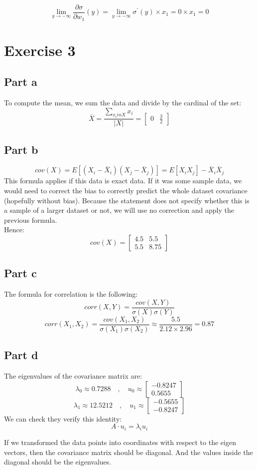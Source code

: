 \documentclass[a4paper, 10pt]{article}
\begin{document}
$$
\lim_{y\to -\infty}\frac{\partial\sigma}{\partial w_1}(y) = \lim_{y\to -\infty} \sigma^\prime(y) \times x_1 = 0 \times x_1 = 0
$$

\section{Exercise 3}
\subsection{Part a}
To compute the mean, we sum the data and divide by the cardinal of the set:
$$
\bar{X} = \frac{\sum_{x_i in X}x_i}{\left\vert X\right\vert} = 
\begin{bmatrix}
    0 & \frac{3}{2}
\end{bmatrix}
$$

\subsection{Part b}
$$
cov(X) = E\left[(X_i - \bar X_i)(X_j - \bar X_j)\right] = E\left[X_iX_j\right] - \bar X_i\bar X_j
$$
This formula applies if this data is exact data. If it was some sample data, we would need to correct the 
bias to correctly predict the whole dataset covariance (hopefully without bias).
Because the statement does not specify whether this is a sample of a larger dataset or not,
we will use no correction and apply the previous formula.
\\
Hence:
$$
cov(X) = \begin{bmatrix}
            4.5 & 5.5\\
            5.5 & 8.75
        \end{bmatrix}
$$

\subsection{Part c}
The formula for correlation is the following:
$$
corr(X, Y) = \frac{cov(X, Y)}{\sigma(X)\sigma(Y)}
$$
$$
corr(X_1, X_2) = \frac{cov(X_1, X_2)}{\sigma(X_1)\sigma(X_2)} \approx \frac{5.5}{2.12\times 2.96} = 0.87
$$

\subsection{Part d}
The eigenvalues of the covariance matrix are:
$$
\lambda_0 \approx 0.7288 \quad , \quad u_0 \approx \begin{bmatrix}
                                            -0.8247\\
                                            0.5655
                                          \end{bmatrix}
$$
$$
\lambda_1 \approx 12.5212 \quad , \quad u_1 \approx \begin{bmatrix}
                                            -0.5655\\
                                            -0.8247
                                          \end{bmatrix}
$$
We can check they verify this identity:
$$
A \cdot u_i = \lambda_iu_i
$$

If we transformed the data points into coordinates with respect to
the eigen vectors, then the covariance matrix should be diagonal. And 
the values inside the diagonal should be the eigenvalues.
\end{document}
